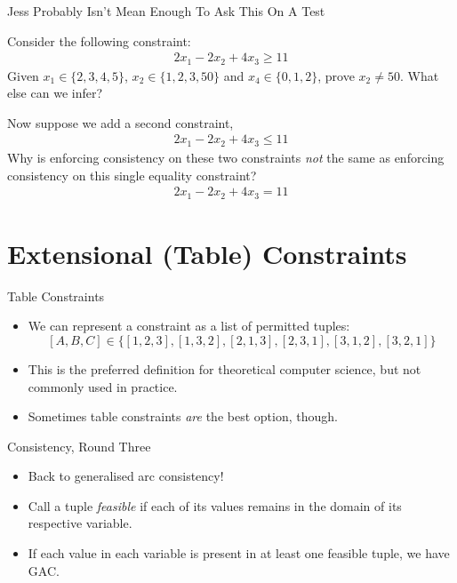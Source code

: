 \documentclass[aspectratio=169,compress,10pt]{beamer}
\begin{document}
\begin{frame}{Jess Probably Isn't Mean Enough To Ask This On A Test}

    Consider the following constraint:
    \begin{align*}
        2x_1 - 2x_2 + 4x_3 \ge 11
    \end{align*}
    Given $x_1 \in \{ 2, 3, 4, 5 \}$, $x_2 \in \{ 1, 2, 3, 50 \}$ and $x_4 \in \{ 0, 1, 2
    \}$, prove $x_2 \ne 50$. What else can we infer?

    Now suppose we add a second constraint,
    \begin{align*}
        2x_1 - 2x_2 + 4x_3 \le 11
    \end{align*}
    Why is enforcing consistency on these two constraints \emph{not} the same as enforcing
    consistency on this single equality constraint?
    \begin{align*}
        2x_1 - 2x_2 + 4x_3 = 11
    \end{align*}

\end{frame}

\section{Extensional (Table) Constraints}

\begin{frame}{Table Constraints}
    \begin{itemize}
        \item We can represent a constraint as a list of permitted
            tuples: \[ [A, B, C] \in \{ [1, 2, 3], [1, 3, 2], [2, 1, 3], [2, 3,
            1], [3, 1, 2], [3, 2, 1] \} \]
        \item This is the preferred definition for theoretical computer
            science, but not commonly used in practice.
        \item Sometimes table constraints \emph{are} the best option, though.
    \end{itemize}
\end{frame}

\begin{frame}{Consistency, Round Three}
    \begin{itemize}
        \item Back to generalised arc consistency!
        \item Call a tuple \emph{feasible} if each of its values remains in the
            domain of its respective variable.
        \item If each value in each variable is present in at least one
            feasible tuple, we have GAC.
    \end{itemize}
\end{frame}
\end{document}
